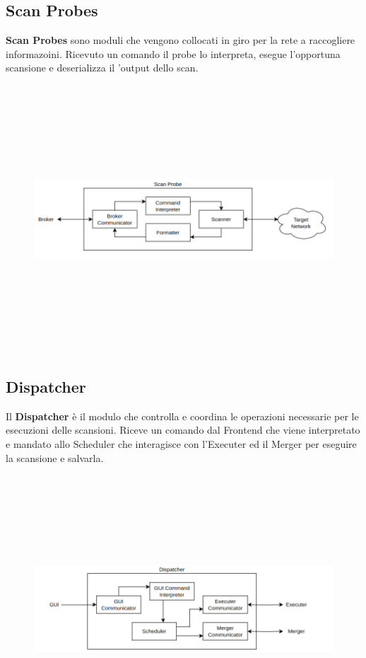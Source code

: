 \documentclass[target=bach,aauheader=,style=]{thud}
\begin{document}
\subsection{Scan Probes}
\textbf{Scan Probes} sono moduli che vengono collocati in giro per la rete a raccogliere informazoini. 
Ricevuto un comando il probe lo interpreta, esegue l'opportuna scansione e deserializza il 'output dello scan.

\begin{figure}[h]
  \includegraphics[width=15cm, height=10cm]{probe}
\centering
\end{figure}

\subsection{Dispatcher} 
Il \textbf{Dispatcher} è il modulo che controlla e coordina le operazioni necessarie per le esecuzioni delle scansioni.
Riceve un comando dal Frontend che viene interpretato e mandato allo Scheduler che interagisce con l'Executer ed il Merger per eseguire la scansione e salvarla.

\begin{figure}[h]
  \includegraphics[width=15cm, height=10cm]{dispatcher}
\centering
\end{figure}
\end{document}
